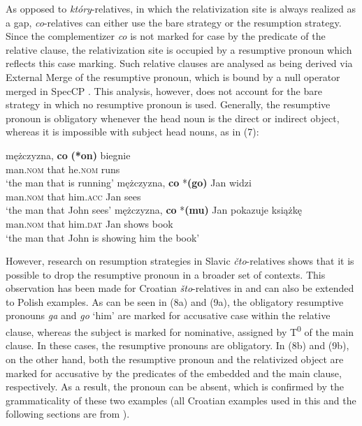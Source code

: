 \documentclass[output=paper]{langsci/langscibook}
\begin{document}
As opposed to \textit{który}{}-relatives, in which the relativization site is always realized as a gap, \textit{co}{}-relatives can either use the bare strategy or the resumption strategy. Since the complementizer \textit{co} is not marked for case by the predicate of the relative clause, the relativization site is occupied by a resumptive pronoun which reflects this case marking. Such relative clauses are analysed as being derived via External Merge of the resumptive pronoun, which is bound by a null operator merged in SpecCP \citep{Borer1984,Chomsky1977,Lavine2003,McCloskey1990,McCloskey2002,Merchant2004,Safir1986,Shlonsky1992}. This analysis, however, does not account for the bare strategy in which no resumptive pronoun is used. Generally, the resumptive pronoun is obligatory whenever the head noun is the direct or indirect object, whereas it is impossible with subject head nouns, as in (7):

\ea%
    \label{ex:leska:7}
    \ea
    \gll mężczyzna,   \textbf{co}   \textbf{(*on)} biegnie\\
         man.\textsc{nom}   that   he.\textsc{nom} runs\\
    \glt ‘the man that is running’
    \ex
    \gll mężczyzna,   \textbf{co} *\textbf{(go)} Jan   widzi\\
         man.\textsc{nom}   that him.\textsc{acc}   Jan   sees\\
    \glt ‘the man that John sees’
    \ex
    \gll mężczyzna,   \textbf{co} *\textbf{(mu)}   Jan   pokazuje   książkę\\
         man.\textsc{nom}   that him.\textsc{dat}   Jan   shows   book\\
    \glt ‘the man that John is showing him the book’
    \z
\z    

However, research on resumption strategies in Slavic \textit{čto}{}-relatives shows that it is possible to drop the resumptive pronoun in a broader set of contexts. This observation has been made for Croatian \textit{što}{}-relatives in \citet[29]{Gračanin-Yuksek2013} and can also be extended to Polish examples. As can be seen in (8a) and (9a), the obligatory resumptive pronouns \textit{ga} and \textit{go} ‘him’ are marked for accusative case within the relative clause, whereas the subject is marked for nominative, assigned by T\textsuperscript{0} of the main clause. In these cases, the resumptive pronouns are obligatory. In (8b) and (9b), on the other hand, both the resumptive pronoun and the relativized object are marked for accusative by the predicates of the embedded and the main clause, respectively. As a result, the pronoun can be absent, which is confirmed by the grammaticality of these two examples (all Croatian examples used in this and the following sections are from \citealt{Gračanin-Yuksek2013}). 
\end{document}
